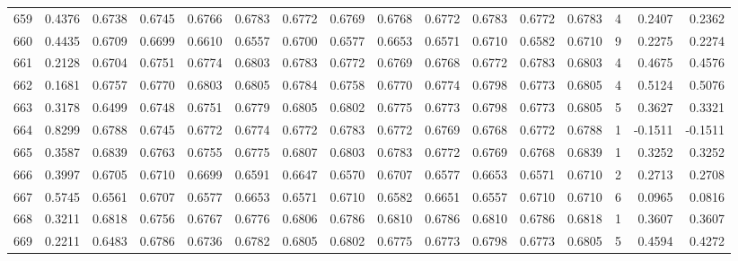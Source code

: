 \begin{tabular}{lrrrrrrrrrrrrrrr}
659 &      0.4376 &  0.6738 &  0.6745 &  0.6766 &  0.6783 &  0.6772 &  0.6769 &  0.6768 &  0.6772 &  0.6783 &   0.6772 &     0.6783 &      4 &                    0.2407 &                     0.2362 \\
660 &      0.4435 &  0.6709 &  0.6699 &  0.6610 &  0.6557 &  0.6700 &  0.6577 &  0.6653 &  0.6571 &  0.6710 &   0.6582 &     0.6710 &      9 &                    0.2275 &                     0.2274 \\
661 &      0.2128 &  0.6704 &  0.6751 &  0.6774 &  0.6803 &  0.6783 &  0.6772 &  0.6769 &  0.6768 &  0.6772 &   0.6783 &     0.6803 &      4 &                    0.4675 &                     0.4576 \\
662 &      0.1681 &  0.6757 &  0.6770 &  0.6803 &  0.6805 &  0.6784 &  0.6758 &  0.6770 &  0.6774 &  0.6798 &   0.6773 &     0.6805 &      4 &                    0.5124 &                     0.5076 \\
663 &      0.3178 &  0.6499 &  0.6748 &  0.6751 &  0.6779 &  0.6805 &  0.6802 &  0.6775 &  0.6773 &  0.6798 &   0.6773 &     0.6805 &      5 &                    0.3627 &                     0.3321 \\
664 &      0.8299 &  0.6788 &  0.6745 &  0.6772 &  0.6774 &  0.6772 &  0.6783 &  0.6772 &  0.6769 &  0.6768 &   0.6772 &     0.6788 &      1 &                   -0.1511 &                    -0.1511 \\
665 &      0.3587 &  0.6839 &  0.6763 &  0.6755 &  0.6775 &  0.6807 &  0.6803 &  0.6783 &  0.6772 &  0.6769 &   0.6768 &     0.6839 &      1 &                    0.3252 &                     0.3252 \\
666 &      0.3997 &  0.6705 &  0.6710 &  0.6699 &  0.6591 &  0.6647 &  0.6570 &  0.6707 &  0.6577 &  0.6653 &   0.6571 &     0.6710 &      2 &                    0.2713 &                     0.2708 \\
667 &      0.5745 &  0.6561 &  0.6707 &  0.6577 &  0.6653 &  0.6571 &  0.6710 &  0.6582 &  0.6651 &  0.6557 &   0.6710 &     0.6710 &      6 &                    0.0965 &                     0.0816 \\
668 &      0.3211 &  0.6818 &  0.6756 &  0.6767 &  0.6776 &  0.6806 &  0.6786 &  0.6810 &  0.6786 &  0.6810 &   0.6786 &     0.6818 &      1 &                    0.3607 &                     0.3607 \\
669 &      0.2211 &  0.6483 &  0.6786 &  0.6736 &  0.6782 &  0.6805 &  0.6802 &  0.6775 &  0.6773 &  0.6798 &   0.6773 &     0.6805 &      5 &                    0.4594 &                     0.4272 \\

\end{tabular}

